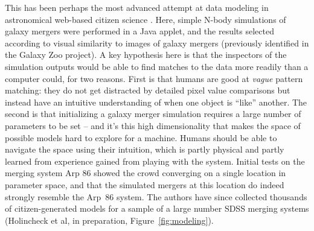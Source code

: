 \documentclass{ar2e}
\def\Fref#1{Figure~\ref{#1}\xspace}
\def\CaseStudy#1{\noindent{\it\bf #1 \,\,\,\,}}
\begin{document}
\CaseStudy{Galaxy Zoo: Mergers} 
This has been perhaps the most advanced attempt at data modeling in 
astronomical web-based citizen science \citep{HolincheckEtal2010,WallinEtal2010}.
Here, simple N-body simulations of galaxy mergers were performed in a Java
applet, and the results selected according to visual similarity to images of
galaxy mergers (previously identified in the Galaxy Zoo project). A key
hypothesis here is that the inspectors of the simulation outputs would be able
to find matches to the data more readily than a computer could, for two reasons.
First is that humans are good at {\it vague} pattern matching: they do not get
distracted by detailed pixel value comparisons but instead have an intuitive
understanding of when one object is ``like'' another. The second is that
initializing a galaxy merger simulation requires a large number of parameters to
be set -- and it's this high dimensionality  that makes the space of possible
models hard to explore for a machine. Humans should be able to navigate the
space using their intuition, which is partly physical and partly learned from
experience gained from playing with the system. Initial tests on the merging
system Arp 86 showed
the crowd converging on a single location in parameter space, and that the
simulated mergers at this location do indeed strongly resemble the Arp~86
system. The authors have since collected thousands of citizen-generated models
for a sample of a large number SDSS merging systems (Holincheck et al, in
preparation, \Fref{fig:modeling}). 
\end{document}
